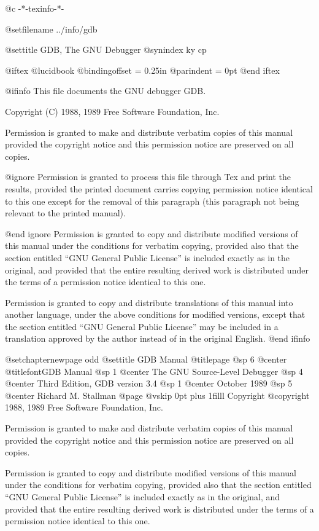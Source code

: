   @c -*-texinfo-*-

@setfilename ../info/gdb

@settitle GDB, The GNU Debugger
@synindex ky cp

@iftex
@lucidbook
@bindingoffset = 0.25in
@parindent = 0pt
@end iftex

@ifinfo
This file documents the GNU debugger GDB.

Copyright (C) 1988, 1989 Free Software Foundation, Inc.

Permission is granted to make and distribute verbatim copies of
this manual provided the copyright notice and this permission notice
are preserved on all copies.

@ignore
Permission is granted to process this file through Tex and print the
results, provided the printed document carries copying permission
notice identical to this one except for the removal of this paragraph
(this paragraph not being relevant to the printed manual).

@end ignore
Permission is granted to copy and distribute modified versions of this
manual under the conditions for verbatim copying, provided also that the
section entitled ``GNU General Public License'' is included exactly as
in the original, and provided that the entire resulting derived work is
distributed under the terms of a permission notice identical to this
one.

Permission is granted to copy and distribute translations of this manual
into another language, under the above conditions for modified versions,
except that the section entitled ``GNU General Public License'' may be
included in a translation approved by the author instead of in the
original English.
@end ifinfo

@setchapternewpage odd
@settitle GDB Manual
@titlepage
@sp 6
@center @titlefont{GDB Manual}
@sp 1
@center The GNU Source-Level Debugger
@sp 4
@center Third Edition, GDB version 3.4
@sp 1
@center October 1989
@sp 5
@center Richard M. Stallman
@page
@vskip 0pt plus 1filll
Copyright @copyright{} 1988, 1989 Free Software Foundation, Inc.

Permission is granted to make and distribute verbatim copies of
this manual provided the copyright notice and this permission notice
are preserved on all copies.

Permission is granted to copy and distribute modified versions of this
manual under the conditions for verbatim copying, provided also that the
section entitled ``GNU General Public License'' is included exactly as
in the original, and provided that the entire resulting derived work is
distributed under the terms of a permission notice identical to this
one.

